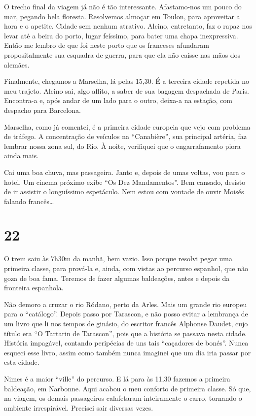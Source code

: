 O trecho final da viagem já não é tão interessante. Afastamo-nos um pouco do mar, pegando bela floresta. Resolvemos almoçar em Toulon, para aproveitar a hora e o apetite. Cidade sem nenhum atrativo. Alcino, entretanto, faz o rapaz nos levar até a beira do porto, lugar feíssimo, para bater uma chapa inexpressiva. Então me lembro de que foi neste porto que os franceses afundaram propositalmente sua esquadra de guerra, para que ela não caísse nas mãos dos alemães.

Finalmente, chegamos a Marselha, lá pelas 15,30. É a terceira cidade repetida no meu trajeto. Alcino sai, algo aflito, a saber de sua bagagem despachada de Paris. Encontra-a e, após andar de um lado para o outro, deixa-a na estação, com despacho para Barcelona.

Marselha, como já comentei, é a primeira cidade europeia que vejo com problema de tráfego. A concentração de veículos na ``Canabière'', sua principal artéria, faz lembrar nossa zona sul, do Rio. À noite, verifiquei que o engarrafamento piora ainda mais.

Cai uma boa chuva, mas passageira. Janto e, depois de umas voltas, vou para o hotel. Um cinema próximo exibe ``Os Dez Mandamentos''. Bem cansado, desisto de ir assistir o longuíssimo espetáculo. Nem estou com vontade de ouvir Moisés falando francês\ldots

\section*{22 \adfflatleafright {}}
O trem saiu às 7h30m da manhã, bem vazio. Isso porque resolvi pegar uma primeira classe, para prová-la e, ainda, com vistas ao percurso espanhol, que não goza de boa fama. Teremos de fazer algumas baldeações, antes e depois da fronteira espanhola.

Não demoro a cruzar o rio Ródano, perto da Arles. Mais um grande rio europeu para o ``catálogo''. Depois passo por Tarascon, e não posso evitar a lembrança de um livro que li nos tempos de ginásio, do escritor francês Alphonse Daudet, cujo título era ``O Tartarin de Tarascon'', pois que a história se passava nesta cidade. História impagável, contando peripécias de uns tais ``caçadores de bonés''. Nunca esqueci esse livro, assim como também nunca imaginei que um dia iria passar por esta cidade.

Nimes é a maior ``ville'' do percurso. E lá para às 11,30 fazemos a primeira baldeação, em Narbonne. Aqui acabou o meu conforto de primeira classe. Só que, na viagem, os demais passageiros calafetaram inteiramente o carro, tornando o ambiente irrespirável. Precisei sair diversas vezes.


